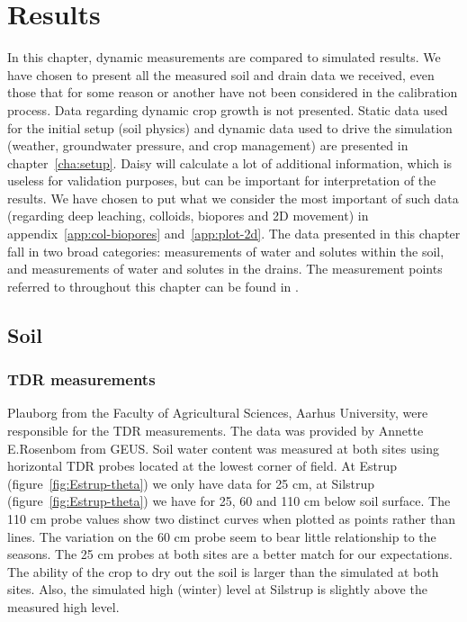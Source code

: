 \chapter{Results}

In this chapter, dynamic measurements are compared to simulated
results.  We have chosen to present all the measured soil and drain
data we received, even those that for some reason or another have not
been considered in the calibration process.  Data regarding dynamic
crop growth is not presented.  Static data used for the initial setup
(soil physics) and dynamic data used to drive the simulation (weather,
groundwater pressure, and crop management) are presented in
chapter~\ref{cha:setup}.  Daisy will calculate a lot of additional
information, which is useless for validation purposes, but can be
important for interpretation of the results.  We have chosen to put
what we consider the most important of such data (regarding deep
leaching, colloids, biopores and 2D movement) in
appendix~\ref{app:col-biopores} and~\ref{app:plot-2d}.  The data
presented in this chapter fall in two broad categories: measurements
of water and solutes within the soil, and measurements of water and
solutes in the drains.  The measurement points referred to throughout
this chapter can be found in \citet{vap2009}.

\section{Soil}

\subsection{TDR measurements}

Plauborg from the Faculty of Agricultural Sciences, Aarhus University,
were responsible for the TDR measurements.  The data was provided by
Annette E.\@ Rosenbom from GEUS\@.  Soil water content was measured at
both sites using horizontal TDR probes located at the lowest corner of
field.  At Estrup (figure~\ref{fig:Estrup-theta}) we only have data
for 25 cm, at Silstrup (figure~\ref{fig:Estrup-theta}) we have for 25,
60 and 110 cm below soil surface.  The 110 cm probe values show two
distinct curves when plotted as points rather than lines.  The
variation on the 60 cm probe seem to bear little relationship to the
seasons.  The 25 cm probes at both sites are a better match for our
expectations.  The ability of the crop to dry out the soil is larger
than the simulated at both sites.  Also, the simulated high (winter)
level at Silstrup is slightly above the measured high level.

